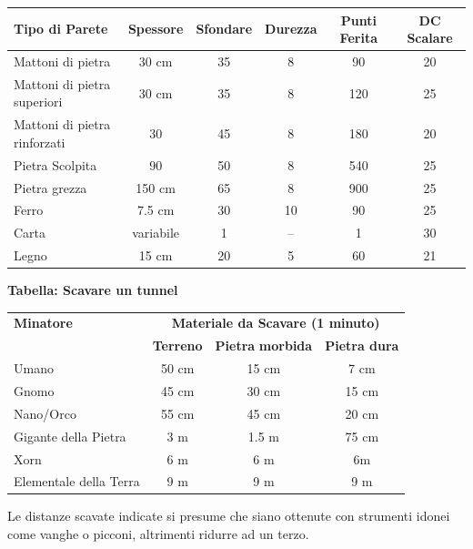 \begin{tabularx}{0.98\textwidth}{lccccc}
\textbf{Tipo di Parete} & \textbf{Spessore} & \textbf{Sfondare} & \textbf{Durezza} & \textbf{Punti Ferita} & \textbf{DC Scalare}\\
\toprule
Mattoni di pietra & 30 cm& 35 & 8 & 90& 20\\
Mattoni di pietra superiori & 30 cm& 35 & 8 & 120 & 25\\
Mattoni di pietra rinforzati & 30 & 45 & 8 & 180 & 20\\
Pietra Scolpita & 90 & 50 & 8 & 540 & 25\\
Pietra grezza & 150 cm & 65 & 8 & 900 & 25\\
Ferro & 7.5 cm & 30 & 10& 90& 25\\
Carta & variabile & 1 & --& 1 & 30\\
Legno & 15 cm& 20 & 5 & 60& 21
\end{tabularx}

\medskip

\textbf{Tabella: Scavare un tunnel}

\medskip

\begin{tabular}{lccc}
\textbf{Minatore}&\multicolumn{3}{c}{\textbf{Materiale da Scavare (1 minuto)}}\\
&\textbf{Terreno}&\textbf{Pietra} \textbf{morbida}&\textbf{Pietra dura}\\
\toprule
Umano&50 cm&15 cm&7 cm\\
Gnomo &45 cm&30 cm&15 cm\\
Nano/Orco & 55 cm&45 cm&20 cm\\
Gigante della Pietra& 3 m& 1.5 m& 75 cm\\
Xorn &6 m&6 m& 6m\\
Elementale della Terra & 9 m&9 m&9 m
\end{tabular}

\medskip

Le distanze scavate indicate si presume che siano ottenute con strumenti idonei come vanghe o picconi, altrimenti ridurre ad un terzo.

